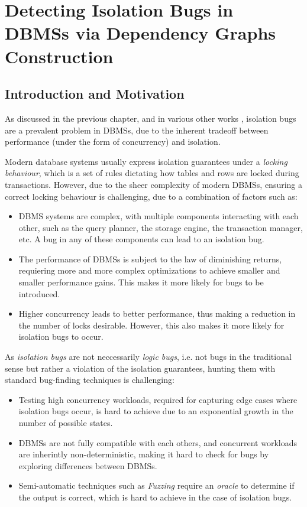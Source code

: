 \chapter{Detecting Isolation Bugs in DBMSs via Dependency Graphs Construction}

\section{Introduction and Motivation}

As discussed in the previous chapter, and in various other works \cite{jiang2023detecting,cui2024understanding_ICSE2024,dou2023detecting_ICSE2023,clark2024validating,cui2022differentially_ASE2022}, isolation bugs are a prevalent problem in DBMSs, due to the inherent tradeoff between performance (under the form of concurrency) and isolation.

Modern database systems usually express isolation guarantees under a \textit{locking behaviour}, which is a set of rules dictating how tables and rows are locked during transactions. However, due to the sheer complexity of modern DBMSs, ensuring a correct locking behaviour is challenging, due to a combination of factors such as:

\begin{itemize}
    \item DBMS systems are complex, with multiple components interacting with each other, such as the query planner, the storage engine, the transaction manager, etc. A bug in any of these components can lead to an isolation bug.
    \item The performance of DBMSs is subject to the law of diminishing returns, requiering more and more complex optimizations to achieve smaller and smaller performance gains. This makes it more likely for bugs to be introduced.
    \item Higher concurrency leads to better performance, thus making a reduction in the number of locks desirable. However, this also makes it more likely for isolation bugs to occur.
\end{itemize}

As \textit{isolation bugs} are not neccessarily \textit{logic bugs}, i.e. not bugs in the traditional sense but rather a violation of the isolation guarantees, hunting them with standard bug-finding techniques is challenging:

\begin{itemize}
    \item Testing high concurrency workloads, required for capturing edge cases where isolation bugs occur, is hard to achieve due to an exponential growth in the number of possible states.
    \item DBMSs are not fully compatible with each others, and concurrent workloads are inherintly non-deterministic, making it hard to check for bugs by exploring differences between DBMSs.
    \item Semi-automatic techniques such as \textit{Fuzzing} require an \textit{oracle} to determine if the output is correct, which is hard to achieve in the case of isolation bugs.
\end{itemize}

